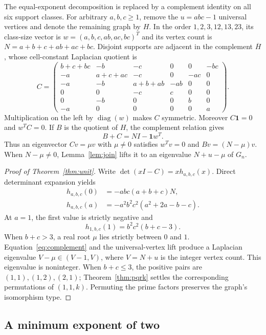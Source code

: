 The equal-exponent decomposition is replaced by a complement identity
on all six support classes. For arbitrary $a,b,c\geq1$, remove the
$u=abc-1$ universal vertices and denote the remaining graph by $H$.
In the order $1,2,3,12,13,23$, its class-size vector is
$w=(a,b,c,ab,ac,bc)^T$ and its vertex count is
$N=a+b+c+ab+ac+bc$. Disjoint supports are adjacent in the complement
$\overline H$, whose cell-constant Laplacian quotient is
\[
C=\begin{pmatrix}
b+c+bc&-b&-c&0&0&-bc\\
-a&a+c+ac&-c&0&-ac&0\\
-a&-b&a+b+ab&-ab&0&0\\
0&0&-c&c&0&0\\
0&-b&0&0&b&0\\
-a&0&0&0&0&a
\end{pmatrix}.
\]
Multiplication on the left by $\operatorname{diag}(w)$ makes $C$
symmetric. Moreover $C\mathbf1=0$ and $w^TC=0$.
If $B$ is the quotient of $H$, the complement relation gives
\begin{equation}
\label{eq:complement}
B+C=NI-\mathbf1w^T.
\end{equation}
Thus an eigenvector $Cv=\mu v$ with $\mu\ne0$ satisfies $w^Tv=0$
and $Bv=(N-\mu)v$. When $N-\mu\ne0$, Lemma~\ref{lem:join}
lifts it to an eigenvalue $N+u-\mu$ of $G_n$.

\begin{proof}[Proof of Theorem~\ref{thm:unit}]
Write $\det(xI-C)=x h_{a,b,c}(x)$. Direct determinant expansion yields
\begin{align*}
h_{a,b,c}(0)&=-abc(a+b+c)N,\\
h_{a,b,c}(a)&=-a^2b^2c^2(a^2+2a-b-c).
\end{align*}
At $a=1$, the first value is strictly negative and
\[
h_{1,b,c}(1)=b^2c^2(b+c-3).
\]
When $b+c>3$, a real root $\mu$ lies strictly between $0$ and $1$.
Equation~\eqref{eq:complement} and the universal-vertex lift produce a
Laplacian eigenvalue $V-\mu\in(V-1,V)$, where $V=N+u$ is the integer
vertex count. This eigenvalue is noninteger. When $b+c\leq3$, the
positive pairs are $(1,1),(1,2),(2,1)$; Theorem~\ref{thm:pqrk}
settles the corresponding permutations of $(1,1,k)$. Permuting the
prime factors preserves the graph's isomorphism type.
\end{proof}

\subsection{A minimum exponent of two}\label{sec:minimum-two}

